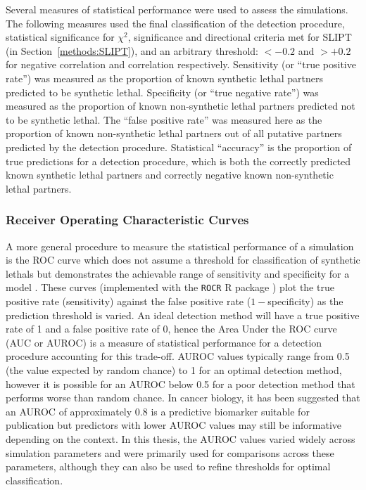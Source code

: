 Several measures of statistical performance were used to assess the simulations. The following measures used the final classification of the detection procedure, statistical significance for $\chi^2$, significance and directional criteria met for \gls{SLIPT} (in Section~\ref{methods:SLIPT}), and an arbitrary threshold: $<-0.2$ and $>+0.2$ for  negative correlation and correlation respectively. Sensitivity (or ``true positive rate'') was measured as the proportion of known \gls{synthetic lethal} partners predicted to be \gls{synthetic lethal}. Specificity (or ``true negative rate'') was measured as the proportion of known non-synthetic lethal partners predicted not to be \gls{synthetic lethal}. The ``false positive rate'' was measured here as the proportion of known non-synthetic lethal partners out of all putative partners predicted by the detection procedure. Statistical ``accuracy'' is the proportion of true predictions for a detection procedure, which is both the correctly predicted known \gls{synthetic lethal} partners and correctly negative known non-synthetic lethal partners.

\subsubsection{Receiver Operating Characteristic Curves} \label{methods:ROC}  
A more general procedure to measure the statistical performance of a simulation is the \gls{ROC} curve which does not assume a threshold for classification of \glspl{synthetic lethal} but demonstrates the achievable range of sensitivity and specificity for a model \citep{Zweig1993, Fawcett2006, Akobeng2007}. These curves (implemented with the \texttt{ROCR} R package \citep{ROCR}) plot the true positive rate (sensitivity) against the false positive rate ($1-$specificity) as the prediction threshold is varied. An ideal detection method will have a true positive rate of 1 and a false positive rate of 0, hence the Area Under the \gls{ROC} curve (AUC or \gls{AUROC}) is a measure of statistical performance for a detection procedure accounting for this trade-off. \gls{AUROC} values typically range from 0.5 (the value expected by random chance) to 1 for an optimal detection method, however it is possible for an \gls{AUROC} below 0.5 for a poor detection method that performs worse than random chance. In cancer biology, it has been suggested that an \gls{AUROC} of approximately $0.8$ is a predictive biomarker suitable for publication \citep{Hajian-Tilaki2013} but predictors with lower \gls{AUROC} values may still be informative depending on the context. In this thesis, the \gls{AUROC} values varied widely across simulation parameters and were primarily used for comparisons across these parameters, although they can also be used to refine thresholds for optimal classification. 


